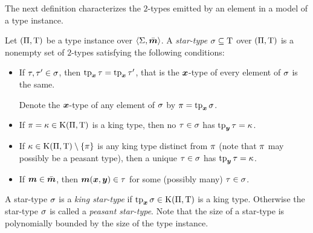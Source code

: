 The next definition characterizes the $2$-types emitted by an element in a model
of a type instance.
\begin{definition}
Let $(\Pi,\mathrm{T})$ be a type instance over $\left\langle \mathrm{\Sigma},\bar{\bm{m}} \right\rangle$.
A \emph{star-type} $\sigma \subseteq \mathrm{T}$ over $(\Pi,\mathrm{T})$ is a nonempty
set of $2$-types satisfying the following conditions:
\begin{itemize}
  \item[\condstpx]\label{cond:stpx}
  If $\tau, {\tau'} \in \sigma$, then $\operatorname{tp}_{\bm{x}}\tau = \operatorname{tp}_{\bm{x}}{\tau'}$, that is the
  $\bm{x}$-type of every element of $\sigma$ is the same.

  Denote the $\bm{x}$-type of any element of $\sigma$ by $\pi = \operatorname{tp}_{\bm{x}}\sigma$.
  \item[\condstpkx]\label{cond:stpkx}
  If $\pi = \kappa \in \mathrm{K}(\Pi,\mathrm{T})$ is a king type, then no
  $\tau\in\sigma$ has $\operatorname{tp}_{\bm{y}}\tau = \kappa$.
  \item[\condstpky]\label{cond:stpky}
  If $\kappa \in \mathrm{K}(\Pi,\mathrm{T}) \setminus \left\{\pi\right\}$ is any king type distinct
  from $\pi$ (note that $\pi$ may possibly be a peasant type), then
  a unique $\tau\in\sigma$ has $\operatorname{tp}_{\bm{y}}\tau = \kappa$.
  \item[\condstpm]\label{cond:stpm} If $\bm{m} \in \bar{\bm{m}}$, then $\bm{m}(\bm{x},\bm{y})
  \in \tau$ for some (possibly many) $\tau \in \sigma$.
\end{itemize}
A star-type $\sigma$ is a \emph{king star-type} if $\operatorname{tp}_{\bm{x}}\sigma \in
\mathrm{K}(\Pi,\mathrm{T})$ is a king type. 
Otherwise the star-type $\sigma$ is called a \emph{peasant star-type}.
Note that the size of a star-type is polynomially bounded by the size of the
type instance.
\end{definition}

